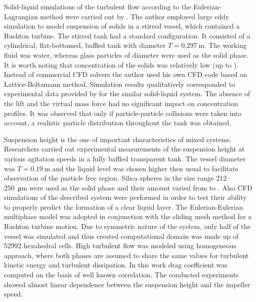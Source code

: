 Solid-liquid simulations of the turbulent flow according to the Eulerian-Lagrangian method were carried out by \citet{derk03}. The author employed large eddy simulation to model suspension of solids in a stirred vessel, which contained a Rushton turbine. The stirred tank had a standard configuration. It consisted of a cylindrical, flat-bottomed, baffled tank with diameter $T=\SI{0.297}{\meter}$. The working fluid was water, whereas glass particles of diameter were used as the solid phase. It is worth noting that concentration of the solids was relatively low (up to ). Instead of commercial CFD solvers the author used his own CFD code based on Lattice-Boltzmann method. Simulation results qualitatively corresponded to experimental data provided by \citet{miche03} for the similar solid-liquid system. The absence of the lift and the virtual mass force had no significant impact on concentration profiles. It was observed that only if particle-particle collisions were taken into account, a realistic particle distribution throughout the tank was obtained.

Suspension height is the one of important characteristics of mixed systems. Researchers \citet{mic04} carried out experimental measurements of the suspension height at various agitation speeds in a fully baffled transparent tank. The vessel diameter was $T=\SI{0.19}{\meter}$ and the liquid level was chosen higher then usual to facilitate observation of the particle free region. Silica spheres in the size range \num{212}--\SI{250}{\micro\meter} were used as the solid phase and their amount varied from  to . Also CFD simulations of the described system were performed in order to test their ability to properly predict the formation of a clear liquid layer. The Eulerian-Eulerian multiphase model was adopted in conjunction with the sliding mesh method for a Rushton turbine motion. Due to symmetric nature of the system, only half of the vessel was simulated and thus created computational domain was made up of \num{52992} hexahedral cells. High turbulent flow was modeled using homogeneous \keps{} approach, where both phases are assumed to share the same values for turbulent kinetic energy and turbulent dissipation. In this work drag coefficient was computed on the basis of well known \citet{schi32} correlation. The conducted experiments showed almost linear dependence between the suspension height and the impeller speed.              
